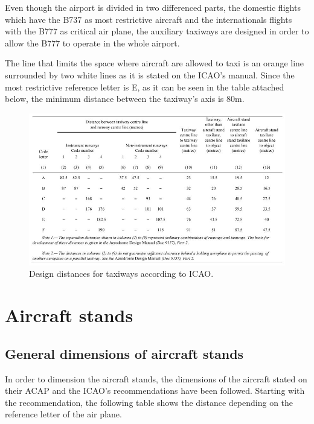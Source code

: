 	Even though the airport is divided in two differenced parts, the domestic flights which have the B737 as most restrictive aircraft and the internationals flights with the B777 as critical air plane, the auxiliary taxiways are designed in order to allow the B777 to operate in the whole airport.
	
	The line that limits the space where aircraft are allowed to taxi is an orange line surrounded by two white lines as it is stated on the ICAO's manual. Since the most restrictive reference letter is E, as it can be seen in the table attached below, the minimum distance between the taxiway's axis is 80m.
	
	\begin{figure}[H]
	\centering
	\includegraphics[clip, trim=0cm 0cm 0cm 0cm, width=1\textwidth]{./images/Annex14/minimumdistancetaxiways}
	\caption{Design distances for taxiways according to ICAO.} %
	\label{} %
	\end{figure}

	\section{Aircraft stands}
		\subsection{General dimensions of aircraft stands}
		In order to dimension the aircraft stands, the dimensions of the aircraft stated on their ACAP and the ICAO's recommendations have been followed. Starting with the recommendation, the following table shows the distance depending on the reference letter of the air plane. 
		
